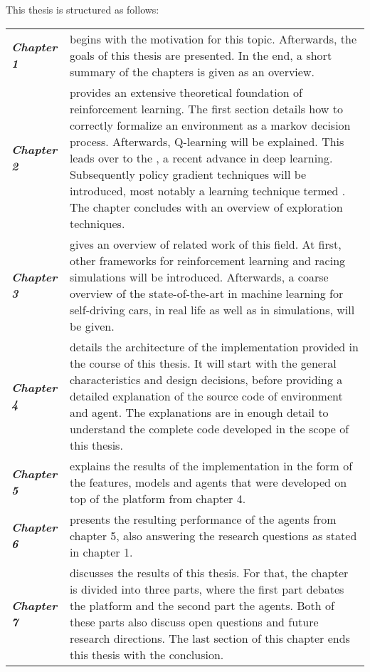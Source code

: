 This thesis is structured as follows:


\renewcommand{\arraystretch}{1.3}
\begin{flushleft}
\begin{tabular}{>{\em}p{2.2cm} p{\textwidth-3.2cm}} 
	\textbf{Chapter 1} & begins with the motivation for this topic. Afterwards, the goals of this thesis are presented. In the end, a short summary of the chapters is given as an overview.\\
	\textbf{Chapter 2} & provides an extensive theoretical foundation of reinforcement learning. The first section details how to correctly formalize an environment as a markov decision process. Afterwards, Q-learning will be explained. This leads over to the \keyword{Deep Q Network}, a recent advance in deep learning. Subsequently policy gradient techniques will be introduced, most notably a learning technique termed \keyword{Deep DPG}. The chapter concludes with an overview of exploration techniques.\\
	\textbf{Chapter 3} & gives an overview of related work of this field. At first, other frameworks for reinforcement learning and racing simulations will be introduced. Afterwards, a coarse overview of the state-of-the-art in machine learning for self-driving cars, in real life as well as in simulations, will be given.\\
	\textbf{Chapter 4} & details the architecture of the implementation provided in the course of this thesis. It will start with the general characteristics and design decisions, before providing a detailed explanation of the source code of environment and agent. The explanations are in enough detail to understand the complete code developed in the scope of this thesis.\\
	\textbf{Chapter 5} & explains the results of the implementation in the form of the features, models and agents that were developed on top of the platform from chapter 4.\\
	\textbf{Chapter 6} & presents the resulting performance of the agents from chapter 5, also answering the research questions as stated in chapter 1.\\
	\textbf{Chapter 7} & discusses the results of this thesis. For that, the chapter is divided into three parts, where the first part debates the platform and the second part the agents. Both of these parts also discuss open questions and future research directions. The last section of this chapter ends this thesis with the conclusion.\\
\end{tabular}
\end{flushleft}